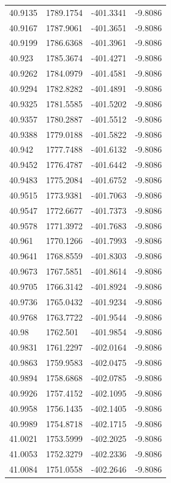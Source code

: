 \begin{table}[H]
\begin{tabular}{llll}
40.9135 & 1789.1754 & -401.3341 & -9.8086 \\
40.9167 & 1787.9061 & -401.3651 & -9.8086 \\
40.9199 & 1786.6368 & -401.3961 & -9.8086 \\
40.923 & 1785.3674 & -401.4271 & -9.8086 \\
40.9262 & 1784.0979 & -401.4581 & -9.8086 \\
40.9294 & 1782.8282 & -401.4891 & -9.8086 \\
40.9325 & 1781.5585 & -401.5202 & -9.8086 \\
40.9357 & 1780.2887 & -401.5512 & -9.8086 \\
40.9388 & 1779.0188 & -401.5822 & -9.8086 \\
40.942 & 1777.7488 & -401.6132 & -9.8086 \\
40.9452 & 1776.4787 & -401.6442 & -9.8086 \\
40.9483 & 1775.2084 & -401.6752 & -9.8086 \\
40.9515 & 1773.9381 & -401.7063 & -9.8086 \\
40.9547 & 1772.6677 & -401.7373 & -9.8086 \\
40.9578 & 1771.3972 & -401.7683 & -9.8086 \\
40.961 & 1770.1266 & -401.7993 & -9.8086 \\
40.9641 & 1768.8559 & -401.8303 & -9.8086 \\
40.9673 & 1767.5851 & -401.8614 & -9.8086 \\
40.9705 & 1766.3142 & -401.8924 & -9.8086 \\
40.9736 & 1765.0432 & -401.9234 & -9.8086 \\
40.9768 & 1763.7722 & -401.9544 & -9.8086 \\
40.98 & 1762.501 & -401.9854 & -9.8086 \\
40.9831 & 1761.2297 & -402.0164 & -9.8086 \\
40.9863 & 1759.9583 & -402.0475 & -9.8086 \\
40.9894 & 1758.6868 & -402.0785 & -9.8086 \\
40.9926 & 1757.4152 & -402.1095 & -9.8086 \\
40.9958 & 1756.1435 & -402.1405 & -9.8086 \\
40.9989 & 1754.8718 & -402.1715 & -9.8086 \\
41.0021 & 1753.5999 & -402.2025 & -9.8086 \\
41.0053 & 1752.3279 & -402.2336 & -9.8086 \\
41.0084 & 1751.0558 & -402.2646 & -9.8086 \\

\end{tabular}
\end{table}
